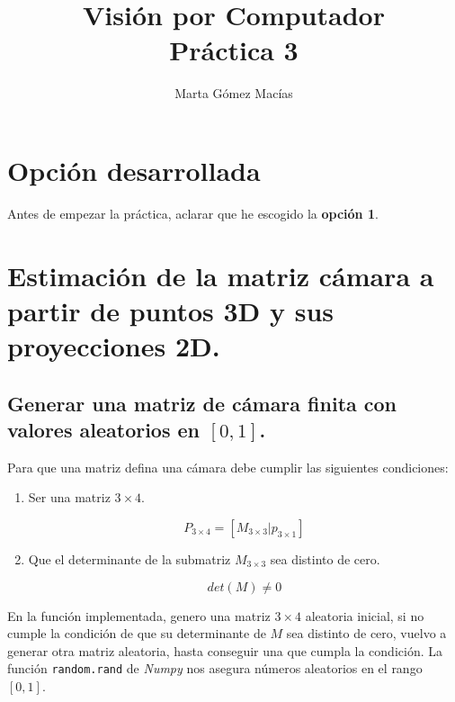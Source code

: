 \documentclass[11pt,a4paper]{article}
\title{\Huge{Visión por Computador} \\ Práctica 3}
\author{Marta Gómez Macías}
\theoremstyle{plain}
\theoremstyle{definition}
\begin{document}
\renewcommand{\listtablename}{Índice de tablas}
\renewcommand{\tablename}{Tabla}

\maketitle

\tableofcontents

\setcounter{section}{-1}
\section{Opción desarrollada}

Antes de empezar la práctica, aclarar que he escogido la \textbf{opción 1}.

\section{Estimación de la matriz cámara a partir de puntos 3D y sus proyecciones 2D.}

\subsection{Generar una matriz de cámara finita con valores aleatorios en $[0,1]$.}

Para que una matriz defina una cámara debe cumplir las siguientes condiciones:

\begin{enumerate}[---]
\item Ser una matriz $3 \times 4$.

\begin{displaymath}
P_{3\times 4} = [M_{3\times 3} | p_{3 \times 1}]
\end{displaymath}

\item Que el determinante de la submatriz $M_{3 \times 3}$ sea distinto de cero.

\begin{displaymath}
det(M) \neq 0
\end{displaymath}

\end{enumerate}

En la función implementada, genero una matriz $3 \times 4$ aleatoria inicial, si no cumple la condición de que su determinante de $M$ sea distinto de cero, vuelvo a generar otra matriz aleatoria, hasta conseguir una que cumpla la condición. La función \texttt{random.rand} de \textit{Numpy} nos asegura números aleatorios en el rango $[0,1]$.
\end{document}
